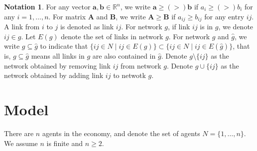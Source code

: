 \documentclass[12pt]{article}
\theoremstyle{definition}
\newtheorem*{notation*}{Notation}
\newcommand{\bm}[1]{\boldsymbol{#1}}
\begin{document}
\begin{notation*}
For any vector $\bm{a}, \bm{b} \in \mathbb{R}^n$, we write $\bm{a} \ge(>) \bm{b}$ if $a_i \ge(>) b_i$ for any $i=1, \ldots, n$.
For matrix $\bm{A}$ and $\bm{B}$, we write $\bm{A} \ge \bm{B}$ if $a_{ij} \ge b_{ij}$ for any entry $ij$.
A link from $i$ to $j$ is denoted as link $ij$.
For network $g$, if link $ij$ is in $g$, we denote $ij \in g$.
Let $E(g)$ denote the set of links in network $g$.
For network $g$ and $\hat{g}$, we write $g \subseteq \hat{g}$ to indicate that $\{ij \in N \mid ij \in E(g)\} \subset \{ij \in N \mid ij \in E(\hat{g})\}$, that is, $g \subseteq \hat{g}$ means all links in $g$ are also contained in $\hat{g}$.
Denote $g \setminus \{ ij \}$ as the network obtained by removing link $ij$ from network $g$.
Denote $g \cup \{ ij \}$ as the network obtained by adding link $ij$ to netwotk $g$.
\end{notation*}

\section{Model}

There are $n$ agents in the economy, and denote the set of agents $N = \{ 1, \ldots, n\}$.
We assume $n$ is finite and $n \ge 2$.
\end{document}
